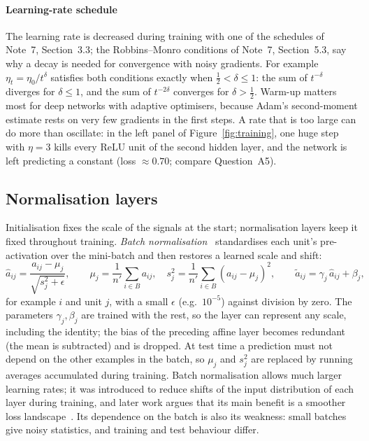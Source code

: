 \documentclass[11pt]{article}
\begin{document}
\paragraph{Learning-rate schedule} The learning rate is decreased during training with one of the schedules of
Note~7, Section~3.3; the Robbins--Monro conditions of Note~7, Section~5.3, say why a decay is needed for convergence
with noisy gradients. For example $\eta_t = \eta_0/t^{\delta}$ satisfies both conditions exactly when
$\frac12 < \delta \le 1$: the sum of $t^{-\delta}$ diverges for $\delta \le 1$, and the sum of $t^{-2\delta}$ converges
for $\delta > \frac12$. Warm-up matters most for deep networks with adaptive optimisers, because Adam's second-moment
estimate rests on very few gradients in the first steps. A rate that is too large can do more than oscillate: in the
left panel of Figure~\ref{fig:training}, one huge step with $\eta = 3$ kills every ReLU unit of the second hidden
layer, and the network is left predicting a constant (loss $\approx 0.70$; compare Question~A5).

\subsection{Normalisation layers}\label{sec:norm}

Initialisation fixes the scale of the signals at the start; normalisation layers keep it fixed throughout training.
\emph{Batch normalisation}~\cite{ioffe2015} standardises each unit's pre-activation over the mini-batch and then
restores a learned scale and shift:
\begin{equation}\label{eq:bn}
  \hat{a}_{ij} = \frac{a_{ij} - \mu_j}{\sqrt{s_j^2 + \epsilon}}, \qquad
  \mu_j = \frac1{n'}\sum_{i \in B}a_{ij}, \quad s_j^2 = \frac1{n'}\sum_{i \in B}(a_{ij} - \mu_j)^2, \qquad
  \tilde{a}_{ij} = \gamma_j\,\hat{a}_{ij} + \beta_j ,
\end{equation}
for example $i$ and unit $j$, with a small $\epsilon$ (e.g.\ $10^{-5}$) against division by zero. The parameters
$\gamma_j, \beta_j$ are trained with the rest, so the layer can represent any scale, including the identity; the bias of
the preceding affine layer becomes redundant (the mean is subtracted) and is dropped. At test time a prediction must not
depend on the other examples in the batch, so $\mu_j$ and $s_j^2$ are replaced by running averages accumulated during
training. Batch normalisation allows much larger learning rates; it was introduced to reduce shifts of the input
distribution of each layer during training, and later work argues that its main benefit is a smoother loss
landscape~\cite{santurkar2018}. Its dependence on the batch is also its weakness: small batches give noisy statistics,
and training and test behaviour differ.
\end{document}
